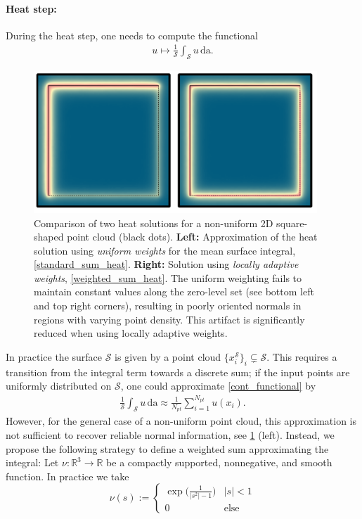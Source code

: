 \documentclass[12pt,openany]{book}
\newcommand{\R}{\mathbb{R}}
\def\S{\mathcal{S}}
\theoremstyle{plainnormal}
\theoremstyle{remark}
\begin{document}
\paragraph{Heat step:}
During the heat step, one needs to compute the functional 
\begin{align} \label{cont_functional}
    u \mapsto \frac{1}{\S}\int_\S u\, \mathrm{da}.
\end{align} 
\begin{figure}[!t]
    \centering
    \includegraphics[width=0.95\textwidth]{Figures/2D_combined2.pdf}
    \caption{ Comparison of two heat solutions for a non-uniform 2D square-shaped point cloud (black dots). \textbf{Left:} Approximation of the heat solution using \emph{uniform weights} for the mean surface integral, \cref{standard_sum_heat}. \textbf{Right:} Solution using \emph{locally adaptive weights}, \cref{weighted_sum_heat}. The uniform weighting fails to maintain constant values along the zero-level set (see bottom left and top right corners), resulting in poorly oriented normals in regions with varying point density. This artifact is significantly reduced when using locally adaptive weights.}
    
\label{heatweights}
\end{figure}In practice the surface $\S$ is given by a point cloud $\{x_i^\S\}_i\subsetneq\mathcal S$. This requires a transition from the integral term towards a discrete sum; if the input points are  uniformly distributed on $\S$, one could approximate
\cref{cont_functional} by \begin{align}\label{standard_sum_heat}
    \frac{1}{\S}\int_\S u\,\mathrm{da}\approx \frac{1}{N_{pt}}\sum_{i = 1}^{N_{pt}} u(x_i).
\end{align}
However, for the general case of a non-uniform point cloud, this approximation is not sufficient to recover reliable normal information, see \cref{heatweights} (left). Instead, we propose the following strategy to define a weighted sum approximating the integral: Let $\nu:\R^3 \rightarrow\R$ be a compactly supported, nonnegative, and smooth function. In practice we take $$\nu(s) := \begin{cases}
    \exp\Big(\frac{1}{|s^2| - 1}\Big) &|s|<1\\
    0  &\text{else}
\end{cases}$$
\end{document}
